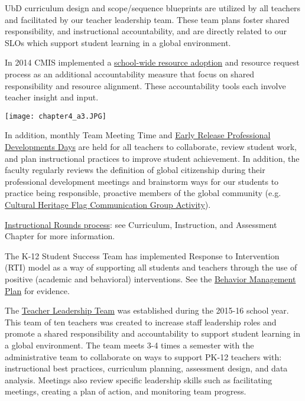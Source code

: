 \begin{findings}
UbD curriculum design and scope/sequence blueprints are utilized by all teachers and facilitated by our teacher leadership team. These team plans foster shared responsibility, and instructional accountability, and are directly related to our SLOs which support student learning in a global environment. 

In 2014 CMIS implemented a \href{https://docs.google.com/a/cmis.ac.th/presentation/d/1wta0iJ57lCPiV0uJm9plaDBeCSll-VbBkMQUeGwpons/edit?usp=sharing}{school-wide resource adoption} and resource request process as an additional accountability measure that focus on shared responsibility and resource alignment. These accountability tools each involve teacher insight and input. 


{\centering\texttt{[image: chapter4\_a3.JPG]}}



In addition, monthly Team Meeting Time and \href{https://docs.google.com/document/d/1tSEBD59kwf83Z0-m1Q4hzNrVwaJMHdracrghwqoSdW0/edit?ts=589d238c}{Early Release Professional Developments Days} are held for all teachers to collaborate, review student work, and plan instructional practices to improve student achievement. In addition, the faculty regularly reviews the definition of global citizenship during their professional development meetings and brainstorm ways for our students to practice being responsible, proactive members of the global community (e.g. \href{https://docs.google.com/a/cmis.ac.th/document/d/1fJmuufIbXlGt7DGAuQ3OBW00VdOY_1QgqLzgEpmxdKQ/edit?usp=sharing}{Cultural Heritage Flag Communication Group Activity}).

\href{https://docs.google.com/document/d/1eDtOzhe_JnpVQmEIoF-IO0ejVrDalm8s0i6PaiDl9hs/edit}{Instructional Rounds process}: see Curriculum, Instruction, and Assessment Chapter for more information. 

The K-12 Student Success Team has implemented Response to Intervention (RTI) model as a way of supporting all students and teachers through the use of positive (academic and behavioral) interventions. See the \href{https://docs.google.com/document/d/16bGCvdQuhHquFdigvip3H5YgfubNVMStl7UpOfCRcFk/edit}{Behavior Management Plan} for evidence. 

The \href{https://docs.google.com/a/cmis.ac.th/document/d/1iW_tWIwRlWU2p0oIOvd3usDsxj9qYDt_2ROwNPBTHSc/edit?usp=sharing}{Teacher Leadership Team} was established during the 2015-16 school year. This team of ten teachers was created to increase staff leadership roles and promote a shared responsibility and accountability to support student learning in a global environment. The team meets 3-4 times a semester with the administrative team to collaborate on ways to support PK-12 teachers with: instructional best practices, curriculum planning, assessment design, and data analysis. Meetings also review specific leadership skills such as facilitating meetings, creating a plan of action, and monitoring team progress.


\end{findings}
